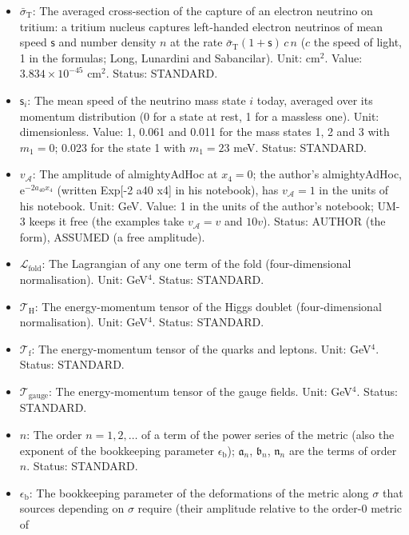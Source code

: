\documentclass[
  10pt,
]{article}
\begin{document}
\begin{itemize}
\item
  \(\bar\sigma_{\mathrm{T}}\): The averaged cross-section of the capture
  of an electron neutrino on tritium: a tritium nucleus captures
  left-handed electron neutrinos of mean speed \(\mathsf{s}\) and number
  density \(n\) at the rate
  \(\bar\sigma_{\mathrm{T}}(1 + \mathsf{s})\,c\,n\) (\(c\) the speed of
  light, 1 in the formulas; Long, Lunardini and Sabancilar). Unit:
  cm\(^2\). Value: \(3.834\times10^{-45}\) cm\(^2\). Status: STANDARD.
\item
  \(\mathsf{s}_i\): The mean speed of the neutrino mass state \(i\)
  today, averaged over its momentum distribution (0 for a state at rest,
  1 for a massless one). Unit: dimensionless. Value: 1, 0.061 and 0.011
  for the mass states 1, 2 and 3 with \(m_1 = 0\); 0.023 for the state 1
  with \(m_1 = 23\) meV. Status: STANDARD.
\item
  \(v_{\mathcal{A}}\): The amplitude of almightyAdHoc at \(x_4 = 0\);
  the author's almightyAdHoc, \(\mathrm{e}^{-2a_{40}x_4}\) (written
  Exp{[}-2 a40 x4{]} in his notebook), has \(v_{\mathcal{A}} = 1\) in
  the units of his notebook. Unit: GeV. Value: 1 in the units of the
  author's notebook; UM-3 keeps it free (the examples take
  \(v_{\mathcal{A}} = v\) and \(10v\)). Status: AUTHOR (the form),
  ASSUMED (a free amplitude).
\item
  \(\mathcal{L}_{\mathrm{fold}}\): The Lagrangian of any one term of the
  fold (four-dimensional normalisation). Unit: GeV\(^4\). Status:
  STANDARD.
\item
  \(\mathcal{T}_{\mathrm{H}}\): The energy-momentum tensor of the Higgs
  doublet (four-dimensional normalisation). Unit: GeV\(^4\). Status:
  STANDARD.
\item
  \(\mathcal{T}_{\mathrm{f}}\): The energy-momentum tensor of the quarks
  and leptons. Unit: GeV\(^4\). Status: STANDARD.
\item
  \(\mathcal{T}_{\mathrm{gauge}}\): The energy-momentum tensor of the
  gauge fields. Unit: GeV\(^4\). Status: STANDARD.
\item
  \(n\): The order \(n = 1, 2, \dots\) of a term of the power series of
  the metric (also the exponent of the bookkeeping parameter
  \(\epsilon_{\mathrm{b}}\)); \(\mathfrak{a}_n\), \(\mathfrak{b}_n\),
  \(\mathfrak{n}_n\) are the terms of order \(n\). Status: STANDARD.
\item
  \(\epsilon_{\mathrm{b}}\): The bookkeeping parameter of the
  deformations of the metric along \(\sigma\) that sources depending on
  \(\sigma\) require (their amplitude relative to the order-0 metric of

\end{itemize}
\end{document}
